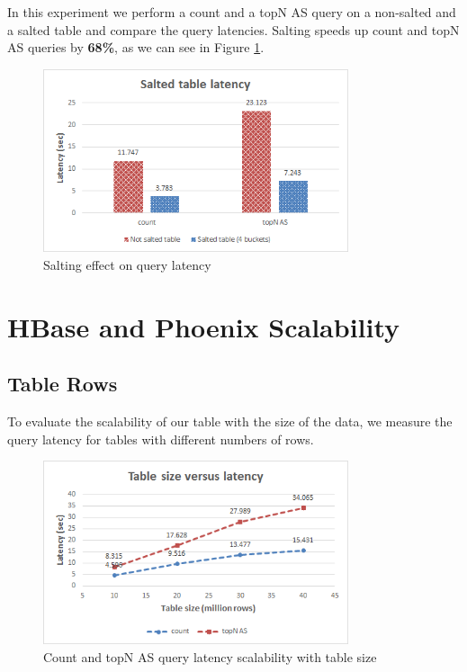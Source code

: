 In this experiment we perform a count and a topN AS query on a non-salted and a salted table and compare the query latencies. Salting speeds up count and topN AS queries by \textbf{68\%}, as we can see in Figure \ref{figure:benchmarks_hbase_salting_latency}.

\begin{figure}[H]
\centering
\includegraphics[width=0.8\textwidth]{figures/benchmarks_hbase_salting_latency}
\caption{Salting effect on query latency}
\label{figure:benchmarks_hbase_salting_latency}
\end{figure}


\section{HBase and Phoenix Scalability}

\subsection{Table Rows}

To evaluate the scalability of our table with the size of the data, we measure the query latency for tables with different numbers of rows.

\begin{figure}[H]
\centering
\includegraphics[width=0.8\textwidth]{figures/benchmarks_hbase_rows_latency_1}
\caption{Count and topN AS query latency scalability with table size}
\label{figure:benchmarks_hbase_rows_latency_1}
\end{figure}

